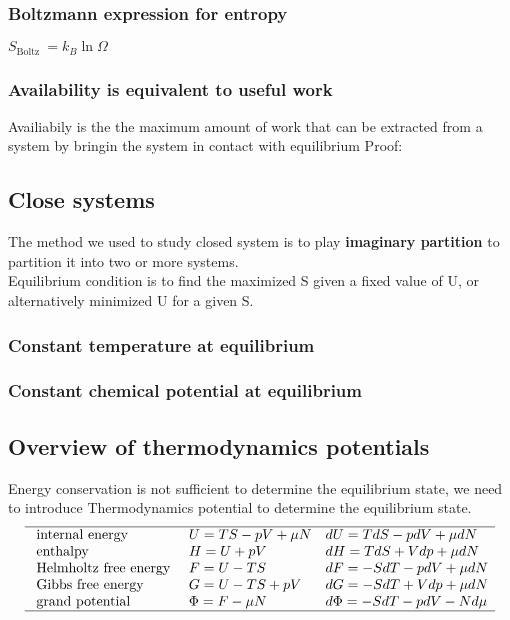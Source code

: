 \documentclass[12pt,a4paper]{article}
\begin{document}
    \subsubsection{Boltzmann expression for entropy}
    $S_{\text {Boltz }}=k_B \ln \Omega$
    \subsubsection{Availability is equivalent to useful work}
    \begin{theorem}
        {Availiabily is the the maximum amount of work that can be extracted from a system by bringin the system in contact with equilibrium}{
            Proof:
        }
    \end{theorem}
    \subsection{Close systems}
    The method we used to study closed system is to play \textbf{imaginary partition}
    to partition it into two or more systems.\\
    Equilibrium condition is to find the maximized S given a fixed value of U, or alternatively
    minimized U for a given S.
    \subsubsection{Constant temperature at equilibrium}
    \subsubsection{Constant chemical potential at equilibrium}
    \subsection{Overview of thermodynamics potentials}
    Energy conservation is not sufficient to determine the equilibrium state, we need to introduce Thermodynamics potential to determine the equilibrium state.
    $$
    \begin{array}{lll}
        \hline \text { internal energy } & U=T S-p V+\mu N & d U=T d S-p d V+\mu d N \\
        \text { enthalpy } & H=U+p V & d H=T d S+V d p+\mu d N \\
        \text { Helmholtz free energy } & F=U-T S & d F=-S d T-p d V+\mu d N \\
        \text { Gibbs free energy } & G=U-T S+p V & d G=-S d T+V d p+\mu d N \\
        \text { grand potential } & \Phi=F-\mu N & d \Phi=-S d T-p d V-N d \mu \\
        \hline
    \end{array}
    $$
\end{document}
